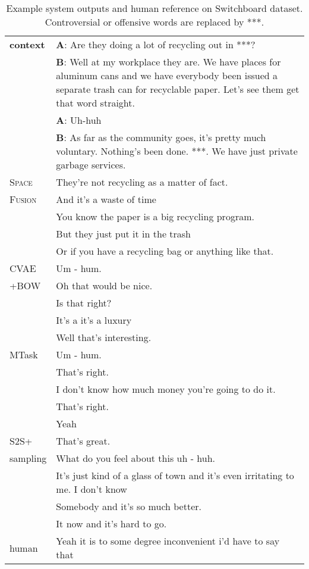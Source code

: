 \documentclass[11pt,a4paper]{article}
\begin{document}
\begin{table}[h]
    \centering
    \small
    \begin{tabular}{p{}|p{}} \hline 
    \textbf{context} & \textbf{A}: Are they doing a lot of recycling out in ***? \\
            & \textbf{B}: Well at my workplace they are. We have places for aluminum cans and we have everybody been issued a separate trash can for recyclable paper. Let's see them get that word straight. \\
            & \textbf{A}: Uh-huh \\
            & \textbf{B}: As far as the community goes, it's pretty much voluntary. Nothing's been done. ***. We have just private garbage services. \\
    \hline
    \hline
    \textsc{Space} &  They're not recycling as a matter of fact.\\
    \textsc{Fusion}    &  And it's a waste of time\\
        &  You know the paper is a big recycling program. \\ 
        &  But they just put it in the trash \\
        &  Or if you have a recycling bag or anything like that. \\
    \hline
    CVAE &  Um - hum.\\
    +BOW    &  Oh that would be nice. \\
        &  Is that right? \\
        &  It's a it's a luxury\\
        &  Well that's interesting. \\
    \hline
    MTask &  Um - hum.\\
        &  That's right.  \\
        &  I don't know how much money you're going to do it. \\
        &  That's right.\\
        &  Yeah\\
    \hline
    S2S+ &  That's great.\\
    sampling &   What do you feel about this uh - huh. \\
       &  It's just kind of a glass of town and it's even irritating to me. I don't know \\
        &  Somebody and it's so much better. \\
        &  It now and it's hard to go. \\
    \hline
    human &  Yeah it is to some degree inconvenient i'd have to say that\\
    \hline
    \end{tabular}
    \caption{Example system outputs and human reference on Switchboard dataset. Controversial or offensive words are replaced by ***.}
    \label{table:example_switchboard}
\end{table}
 
\end{document}
